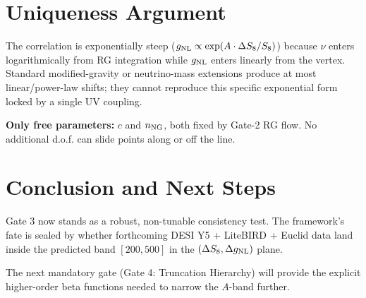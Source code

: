 \documentclass[11pt,a4paper]{article}
\begin{document}
\section{Uniqueness Argument}
The correlation is exponentially steep (\(g_{\rm NL} \propto \exp(A \cdot \Delta S_8/S_8)\)) because \(\nu\) enters logarithmically from RG integration while \(g_{\rm NL}\) enters linearly from the vertex. Standard modified-gravity or neutrino-mass extensions produce at most linear/power-law shifts; they cannot reproduce this specific exponential form locked by a single UV coupling.

\textbf{Only free parameters:} \(c\) and \(n_{\rm NG}\), both fixed by Gate-2 RG flow. No additional d.o.f. can slide points along or off the line.

\section{Conclusion and Next Steps}
Gate 3 now stands as a robust, non-tunable consistency test. The framework's fate is sealed by whether forthcoming DESI Y5 + LiteBIRD + Euclid data land inside the predicted band \([200,500]\) in the \((\Delta S_8, \Delta g_{\rm NL})\) plane.

The next mandatory gate (Gate 4: Truncation Hierarchy) will provide the explicit higher-order beta functions needed to narrow the \(A\)-band further.



\nocite{*}


\clearpage
\end{document}
